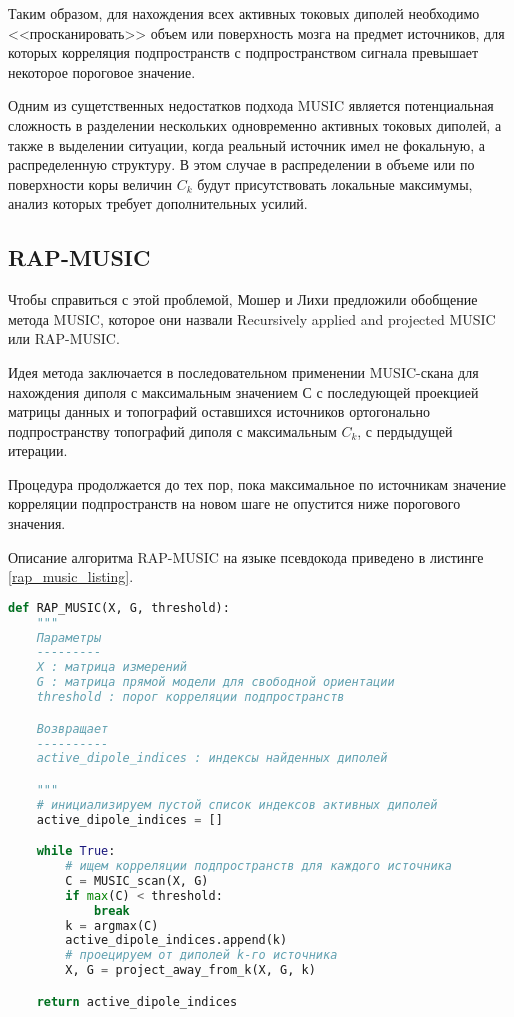 Таким образом, для нахождения всех активных токовых диполей необходимо
<<просканировать>> объем или поверхность мозга на предмет источников, для которых
корреляция подпространств с подпространством сигнала превышает некоторое
пороговое значение. 

Одним из сущетственных недостатков подхода MUSIC является потенциальная
сложность в разделении нескольких одновременно активных токовых диполей, а также
в выделении ситуации, когда реальный источник имел не фокальную, а распределенную
структуру. В этом случае в распределении в объеме или по поверхности коры
величин $C_k$ будут присутствовать локальные максимумы, анализ которых требует дополнительных
усилий.


\subsection{RAP-MUSIC}
\label{subsection:rap_music}
Чтобы справиться с этой проблемой, Мошер и Лихи предложили обобщение метода MUSIC, которое
они назвали Recursively applied and projected MUSIC или RAP-MUSIC.

Идея метода заключается в последовательном применении MUSIC-скана для нахождения
диполя с максимальным значением $С$ с последующей проекцией матрицы данных и топографий оставшихся источников
ортогонально подпространству топографий диполя с максимальным $C_k$, с пердыдущей итерации.

Процедура продолжается до тех пор, пока максимальное по источникам значение корреляции подпространств
на новом шаге не опустится ниже порогового значения.

Описание алгоритма RAP-MUSIC на языке псевдокода приведено в листинге \ref{rap_music_listing}.

\begin{ListingEnv}[!h]
    \begin{lstlisting}[language=Python]
def RAP_MUSIC(X, G, threshold):
    """
    Параметры
    ---------
    X : матрица измерений
    G : матрица прямой модели для свободной ориентации
    threshold : порог корреляции подпространств

    Возвращает
    ----------
    active_dipole_indices : индексы найденных диполей

    """
    # инициализируем пустой список индексов активных диполей
    active_dipole_indices = []

    while True:
        # ищем корреляции подпространств для каждого источника
        C = MUSIC_scan(X, G)
        if max(C) < threshold:
            break
        k = argmax(C)
        active_dipole_indices.append(k) 
        # проецируем от диполей k-го источника
        X, G = project_away_from_k(X, G, k) 

    return active_dipole_indices
    \end{lstlisting}
    \label{rap_music_listing}
\end{ListingEnv}

